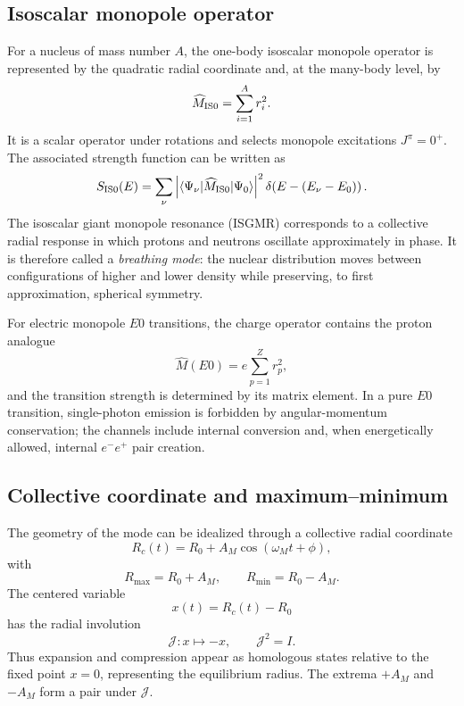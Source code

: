\documentclass[11pt]{amsart}
\theoremstyle{definition}
\theoremstyle{remark}
\begin{document}
\subsection{Isoscalar monopole operator}
For a nucleus of mass number $A$, the one-body isoscalar monopole operator is represented by the quadratic radial coordinate and, at the many-body level, by
\begin{equation}\label{eq:mis0}
  \widehat M_{\rm IS0}=\sum_{i=1}^{A} r_i^2 .
\end{equation}
It is a scalar operator under rotations and selects monopole excitations $J^\pi=0^+$. The associated strength function can be written as
\begin{equation}\label{eq:monostrength}
 S_{\rm IS0}(E)=\sum_{\nu}
 \left|\langle \Psi_\nu|\widehat M_{\rm IS0}|\Psi_0\rangle\right|^2
 \delta\!\left(E-(E_\nu-E_0)\right).
\end{equation}
The isoscalar giant monopole resonance (ISGMR) corresponds to a collective radial response in which protons and neutrons oscillate approximately in phase. It is therefore called a \emph{breathing mode}: the nuclear distribution moves between configurations of higher and lower density while preserving, to first approximation, spherical symmetry.

For electric monopole $E0$ transitions, the charge operator contains the proton analogue
\begin{equation}\label{eq:e0op}
  \widehat M(E0)=e\sum_{p=1}^{Z} r_p^2,
\end{equation}
and the transition strength is determined by its matrix element. In a pure $E0$ transition, single-photon emission is forbidden by angular-momentum conservation; the channels include internal conversion and, when energetically allowed, internal $e^-e^+$ pair creation.

\subsection{Collective coordinate and maximum--minimum}
The geometry of the mode can be idealized through a collective radial coordinate
\begin{equation}\label{eq:radialcollective}
  R_c(t)=R_0+A_M\cos(\omega_M t+\phi),
\end{equation}
with
\begin{equation}
  R_{\max}=R_0+A_M,
  \qquad
  R_{\min}=R_0-A_M.
\end{equation}
The centered variable
\begin{equation}
  x(t)=R_c(t)-R_0
\end{equation}
has the radial involution
\begin{equation}\label{eq:radialinvolution}
  \mathcal J:x\mapsto -x,
  \qquad
  \mathcal J^2=I.
\end{equation}
Thus expansion and compression appear as homologous states relative to the fixed point $x=0$, representing the equilibrium radius. The extrema $+A_M$ and $-A_M$ form a pair under $\mathcal J$.
\end{document}
